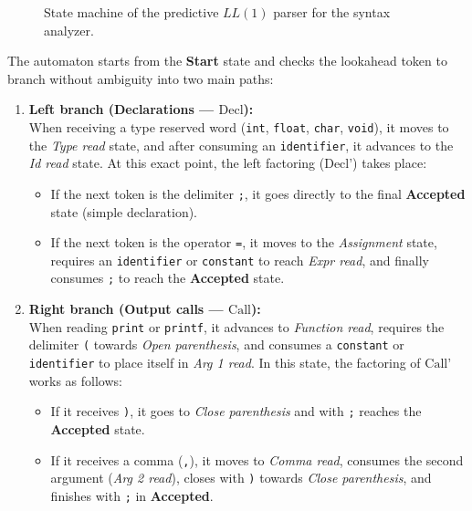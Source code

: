\documentclass[letterpaper,12pt,oneside]{article}
\begin{document}
\begin{figure}[htbp]
    \caption{State machine of the predictive $LL(1)$ parser for the syntax analyzer.}
    \label{fig:maquina_parser}
\end{figure}

The automaton starts from the \textbf{Start} state and checks the lookahead token to branch without ambiguity into two main paths:
\begin{enumerate}
    \item \textbf{Left branch (Declarations --- $\text{Decl}$):} \\
    When receiving a type reserved word (\texttt{int}, \texttt{float}, \texttt{char}, \texttt{void}), it moves to the \textit{Type read} state, and after consuming an \texttt{identifier}, it advances to the \textit{Id read} state. At this exact point, the left factoring ($\text{Decl'}$) takes place:
    \begin{itemize}
        \item If the next token is the delimiter \texttt{;}, it goes directly to the final \textbf{Accepted} state (simple declaration).
        \item If the next token is the operator \texttt{=}, it moves to the \textit{Assignment} state, requires an \texttt{identifier} or \texttt{constant} to reach \textit{Expr read}, and finally consumes \texttt{;} to reach the \textbf{Accepted} state.
    \end{itemize}

    \item \textbf{Right branch (Output calls --- $\text{Call}$):} \\
    When reading \texttt{print} or \texttt{printf}, it advances to \textit{Function read}, requires the delimiter \texttt{(} towards \textit{Open parenthesis}, and consumes a \texttt{constant} or \texttt{identifier} to place itself in \textit{Arg 1 read}. In this state, the factoring of $\text{Call'}$ works as follows:
    \begin{itemize}
        \item If it receives \texttt{)}, it goes to \textit{Close parenthesis} and with \texttt{;} reaches the \textbf{Accepted} state.
        \item If it receives a comma (\texttt{,}), it moves to \textit{Comma read}, consumes the second argument (\textit{Arg 2 read}), closes with \texttt{)} towards \textit{Close parenthesis}, and finishes with \texttt{;} in \textbf{Accepted}.
    \end{itemize}
\end{enumerate}
\end{document}
